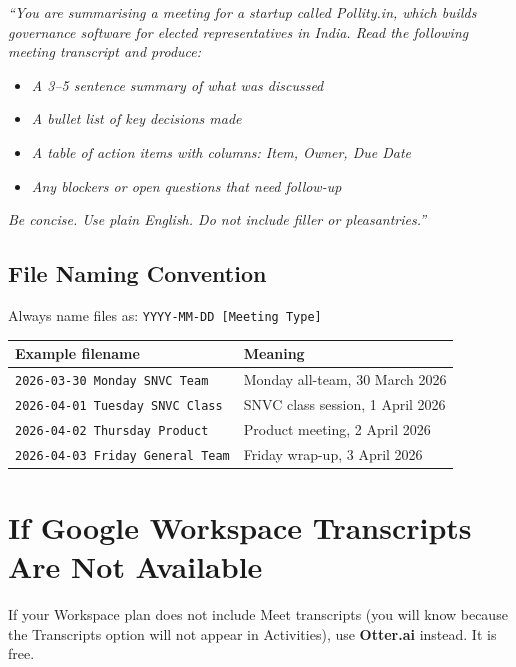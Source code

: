 \documentclass[11pt, a4paper]{article}
\begin{document}
\begin{tcolorbox}[colback=googleblue!8, colframe=googleblue, sharp corners, breakable, fontupper=\small]
\textit{``You are summarising a meeting for a startup called Pollity.in, which builds governance software for elected representatives in India. Read the following meeting transcript and produce:}
\begin{itemize}
\item \textit{A 3--5 sentence summary of what was discussed}
\item \textit{A bullet list of key decisions made}
\item \textit{A table of action items with columns: Item, Owner, Due Date}
\item \textit{Any blockers or open questions that need follow-up}
\end{itemize}
\textit{Be concise. Use plain English. Do not include filler or pleasantries.''}
\end{tcolorbox}

\subsection{File Naming Convention}

Always name files as: \quad \texttt{YYYY-MM-DD [Meeting Type]}

\begin{tabularx}{\linewidth}{lX}
\toprule
\textbf{Example filename} & \textbf{Meaning} \\
\midrule
\texttt{2026-03-30 Monday SNVC Team}    & Monday all-team, 30 March 2026 \\
\texttt{2026-04-01 Tuesday SNVC Class}  & SNVC class session, 1 April 2026 \\
\texttt{2026-04-02 Thursday Product}    & Product meeting, 2 April 2026 \\
\texttt{2026-04-03 Friday General Team} & Friday wrap-up, 3 April 2026 \\
\bottomrule
\end{tabularx}

\newpage

\section{If Google Workspace Transcripts Are Not Available}

If your Workspace plan does not include Meet transcripts (you will know because the Transcripts option will not appear in Activities), use \textbf{Otter.ai} instead. It is free.
\end{document}

